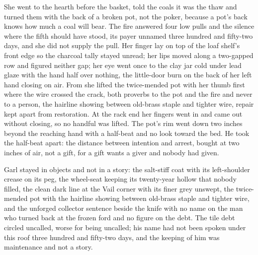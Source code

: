She went to the hearth before the basket, told the coals it was the thaw and turned them with the back of a broken pot, not the poker, because a pot's back knows how much a coal will bear. The fire answered four low pulls and the silence where the fifth should have stood, its payer unnamed three hundred and fifty-two days, and she did not supply the pull. Her finger lay on top of the loaf shelf's front edge so the charcoal tally stayed unread; her lips moved along a two-gapped row and figured neither gap; her eye went once to the clay jar cold under lead glaze with the hand half over nothing, the little-door burn on the back of her left hand closing on air. From  she lifted the twice-mended pot with her thumb first where the wire crossed the crack, both proverbs to the pot and the fire and never to a person, the hairline showing between old-brass staple and tighter wire, repair kept apart from restoration. At the rack end her fingers went in and came out without closing, so no handful was lifted. The pot's rim went down two inches beyond the reaching hand with a half-beat and no look toward the bed. He took the half-beat apart: the distance between intention and arrest, bought at two inches of air, not a gift, for a gift wants a giver and nobody had given.

Garl stayed in objects and not in a story: the salt-stiff coat with its left-shoulder crease on its peg, the wheel-seat keeping its twenty-year hollow that nobody filled, the clean dark line at the Vail corner with its finer grey unswept, the twice-mended pot with the hairline showing between old-brass staple and tighter wire, and the unforged collector sentence beside the knife with no name on the man who turned back at the frozen ford and no figure on the debt. The tile debt circled uncalled, worse for being uncalled; his name had not been spoken under this roof three hundred and fifty-two days, and the keeping of him was maintenance and not a story.


